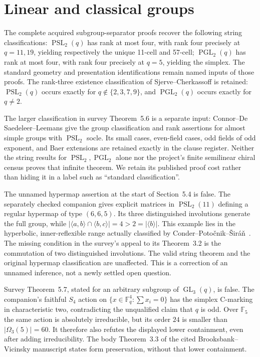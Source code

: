 \documentclass[11pt]{article}
\newcommand{\gen}[1]{\langle#1\rangle}
\newcommand{\PSL}{\operatorname{PSL}}\newcommand{\PGL}{\operatorname{PGL}}
\newcommand{\note}[1]{\marginpar{\raggedright\scriptsize #1}}
\begin{document}
\section{Linear and classical groups}
The complete acquired subgroup-separator proofs recover the following
string classifications: $\PSL_2(q)$ has rank at most four, with rank
four precisely at $q=11,19$, yielding respectively the unique
11-cell and 57-cell; $\PGL_2(q)$ has rank at most four, with rank
four precisely at $q=5$, yielding the simplex. The standard geometry
and presentation identifications remain named inputs of those proofs.
The rank-three existence classification of Sjerve--Cherkassoff is
retained: $\PSL_2(q)$ occurs exactly for $q\notin\{2,3,7,9\}$,
and $\PGL_2(q)$ occurs exactly for $q\ne2$.

The larger classification in survey Theorem~5.6 is a separate input:
Connor--De Saedeleer--Leemans \cite{almost2} give the group
classification and rank assertions for almost simple groups with $\PSL_2$ socle.
Its small cases, even-field cases, odd fields of odd exponent, and
Baer extensions are retained exactly in the clause register. Neither
the string results for $\PSL_2,\PGL_2$ alone nor the project's finite
semilinear chiral census proves that infinite theorem. We retain its
published proof cost rather than hiding it in a label such as
``standard classification''.

\note{Correction}
The unnamed hypermap assertion at the start of Section~5.4 is false.
The separately checked companion gives explicit matrices in
$\operatorname{PSL}_2(11)$ defining a regular hypermap of type $(6,6,5)$.
Its three distinguished involutions generate the full group, while
$|\gen{a,b}\cap\gen{b,c}|=4>2=|\gen b|$.
This example lies in the hyperbolic, inner-reflexible range actually
classified by Conder--Poto\v cnik--\v Sir\'a\v n~\cite{hypermaps}.
The missing condition in the survey's appeal to its Theorem~3.2 is the
commutation of two distinguished involutions. The valid string theorem
and the original hypermap classification are unaffected. This is a
correction of an unnamed inference, not a newly settled open question.

\note{Correction}
Survey Theorem~5.7, stated for an arbitrary subgroup of
$\operatorname{GL}_3(q)$, is false. The companion's faithful $S_4$
action on $\{x\in\mathbb F_q^4:\sum x_i=0\}$ has the simplex
C-marking in characteristic two, contradicting the unqualified claim
that $q$ is odd. Over $\mathbb F_5$ the same action is absolutely
irreducible, but its order $24$ is smaller than
$|\Omega_3(5)|=60$. It therefore also refutes the displayed lower
containment, even after adding irreducibility. The body Theorem~3.3
of the cited Brooksbank--Vicinsky manuscript states form preservation,
without that lower containment.
\end{document}
